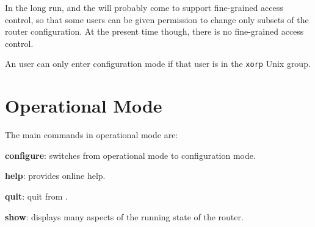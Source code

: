 In the long run, \xorpsh and the \rtrmgr will probably come to support
fine-grained access control, so that some users can be given
permission to change only subsets of the router configuration.  At the
present time though, there is no fine-grained access control.

An user can only enter configuration mode if that user is in the {\tt xorp}
Unix group.

\section{Operational Mode}
\noindent{}
\vspace{0.1in}

The main commands in operational mode are:
\begin{description}
\item{\bf configure}: switches from operational mode to configuration
mode.
\item{\bf help}: provides online help.
\item{\bf quit}: quit from \xorpsh.
\item{\bf show}: displays many aspects of the running state of the
router.
\end{description}

\newpage
